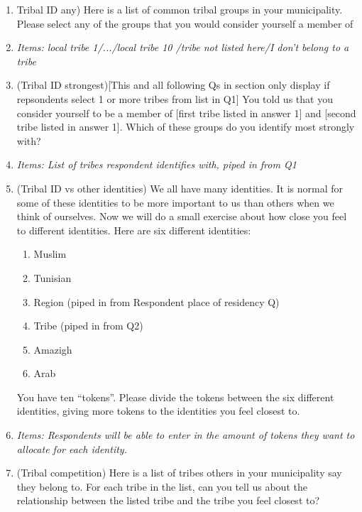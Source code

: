 \documentclass[12pt]{article}
\newcommand{\alerta}[1]{\textcolor{harvardcrimson}{#1}}
\begin{document}
\begin{enumerate}

\item \alerta{Tribal ID any)} Here is a list of common tribal groups in your municipality. Please select any of the groups that you would consider yourself a member of

    \item[] \textit{Items: local tribe 1/.../local tribe 10 /tribe not listed here/I don’t belong to a tribe}
    
       \item \alerta{(Tribal ID strongest)}[This and all following Qs in section only display if repsondents select 1 or more tribes from list in Q1]  You told us that you consider yourself to be a member of [first tribe listed in answer 1] and [second tribe listed in answer 1]. Which of these groups do you identify most strongly with?
    \item[] \textit{Items: List of tribes respondent identifies with, piped in from Q1}
    
    \item \alerta{(Tribal ID vs other identities)}  We all have many identities.  It is normal for some of these identities to be more important to us than others when we think of ourselves. Now we will do a small exercise about how close you feel to different identities. Here are six different identities:
    \begin{enumerate}
        \item Muslim
        \item Tunisian
        \item Region (piped in from Respondent place of residency Q)
        \item Tribe (piped in from Q2)
        \item Amazigh
        \item Arab
    \end{enumerate}
    You have ten “tokens”. Please divide the tokens between the six different identities, giving more tokens to the identities you feel closest to.


    \item[] \textit{Items: Respondents will be able to enter in the amount of tokens they want to allocate for each identity.}
    
    \item \alerta{(Tribal competition)}  Here is a list of tribes others in your municipality say they belong to. For each tribe in the list, can you tell us about the relationship between the listed tribe and the tribe you feel closest to?


\end{enumerate}
\end{document}
